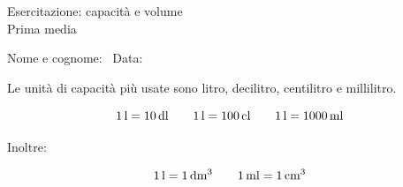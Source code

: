 \documentclass[11pt,a4paper]{article}
\begin{document}
\begin{center}
  {\Large Esercitazione: capacità e volume}\\[0.2cm]
  {\normalsize Prima media}
\end{center}

\vspace{0.3cm}

Nome e cognome:\ \hrulefill
\hfill
Data:\ \hrulefill

\vspace{0.5cm}

\begin{reminder}
Le unità di capacità più usate sono litro, decilitro, centilitro e millilitro.

\[
1\,\mathrm{l} = 10\,\mathrm{dl}
\qquad
1\,\mathrm{l} = 100\,\mathrm{cl}
\qquad
1\,\mathrm{l} = 1000\,\mathrm{ml}
\]

Inoltre:

\[
1\,\mathrm{l} = 1\,\mathrm{dm^3}
\qquad
1\,\mathrm{ml} = 1\,\mathrm{cm^3}
\]
\end{reminder}


\end{document}
